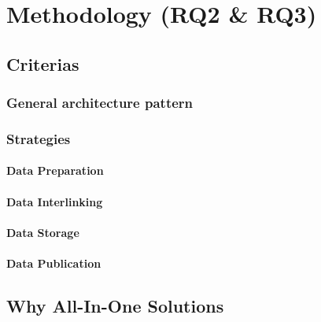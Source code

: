 \chapter{Methodology (RQ2 \& RQ3)}
\section{Criterias}
\subsection{General architecture pattern}
\subsection{Strategies}
\subsubsection{Data Preparation}
\subsubsection{Data Interlinking}
\subsubsection{Data Storage}
\subsubsection{Data Publication}
\section{Why All-In-One Solutions}